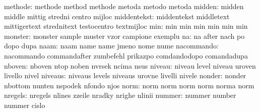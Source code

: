                   methode: methode                   method
                           methode                   metoda
                           metodo                    metoda
                   midden: midden                    middle
                           mittig                    stredni
                           centro                    mijloc %
              middentekst: middentekst               middletext
                           mittigertext              strednitext
                           testocentro               textmijloc %
                      min: min                       min
                           min                       min
                           min                       min
                  monster: monster                   sample
                           muster                    vzor
                           campione                  exemplu
                       na: na                        after
                           nach                      po
                           dopo                      dupa
                     naam: naam                      name
                           name                      jmeno
                           nome                      nume
               nacommando: nacommando                commandafter
                           zumbefehl                 prikazpo
                           comdandodopo              comandadupa
                   nboven: nboven                    ntop
                           noben                     nvrsek
                           ncima                     nsus
                   niveau: niveau                    level
                           niveau                    uroven
                           livello                   nivel
                  niveaus: niveaus                   levels
                           niveaus                   urovne
                           livelli                   nivele
                   nonder: nonder                    nbottom
                           nunten                    nspodek
                           nfondo                    njos
                     norm: norm                      norm
                           norm                      norm
                           norma                     norm
                  nregels: nregels                   nlines
                           zzeile                    nradky
                           nrighe                    nlinii
                   nummer: nummer                    number
                           nummer                    cislo

